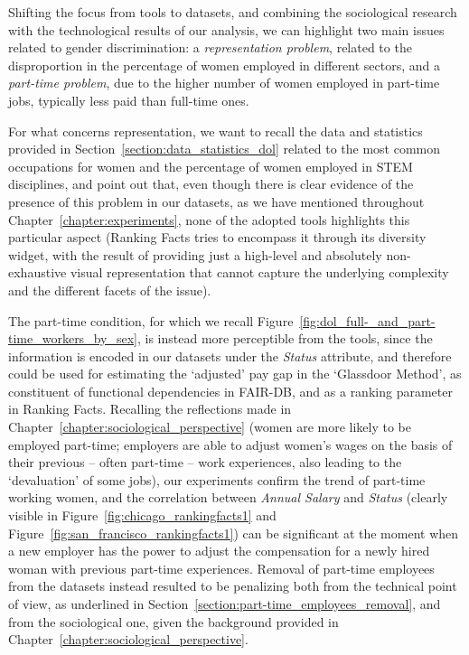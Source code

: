 Shifting the focus from tools to datasets, and combining the sociological research with the technological results of our analysis, we can highlight two main issues related to gender discrimination: a \textit{representation problem}, related to the disproportion in the percentage of women employed in different sectors, and a \textit{part-time problem}, due to the higher number of women employed in part-time jobs, typically less paid than full-time ones.

For what concerns representation, we want to recall the data and statistics provided in Section~\ref{section:data_statistics_dol} related to the most common occupations for women and the percentage of women employed in STEM disciplines, and point out that, even though there is clear evidence of the presence of this problem in our datasets, as we have mentioned throughout Chapter~\ref{chapter:experiments}, none of the adopted tools highlights this particular aspect (Ranking Facts tries to encompass it through its diversity widget, with the result of providing just a high-level and absolutely non-exhaustive visual representation that cannot capture the underlying complexity and the different facets of the issue).

The part-time condition, for which we recall Figure~\ref{fig:dol_full-_and_part-time_workers_by_sex}, is instead more perceptible from the tools, since the information is encoded in our datasets under the \textit{Status} attribute, and therefore could be used for estimating the `adjusted' pay gap in the `Glassdoor Method', as constituent of functional dependencies in FAIR-DB, and as a ranking parameter in Ranking Facts. Recalling the reflections made in Chapter~\ref{chapter:sociological_perspective} (women are more likely to be employed part-time; employers are able to adjust women's wages on the basis of their previous -- often part-time -- work experiences, also leading to the `devaluation' of some jobs), our experiments confirm the trend of part-time working women, and the correlation between \textit{Annual Salary} and \textit{Status} (clearly visible in Figure~\ref{fig:chicago_rankingfacts1} and Figure~\ref{fig:san_francisco_rankingfacts1}) can be significant at the moment when a new employer has the power to adjust the compensation for a newly hired woman with previous part-time experiences.
Removal of part-time employees from the datasets instead resulted to be penalizing both from the technical point of view, as underlined in Section~\ref{section:part-time_employees_removal}, and from the sociological one, given the background provided in Chapter~\ref{chapter:sociological_perspective}.


